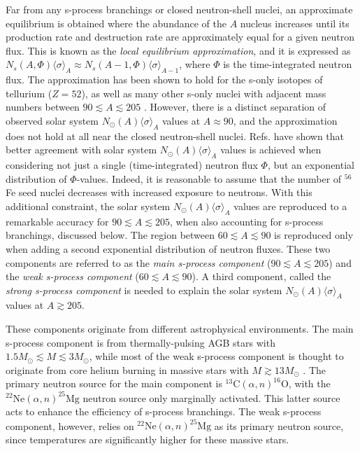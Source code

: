 Far from any s-process branchings or closed neutron-shell nuclei, an approximate equilibrium is obtained where the abundance of the $A$ nucleus increases until its production rate and destruction rate are approximately equal for a given neutron flux. This is known as the \emph{local equilibrium approximation}, and it is expressed as $N_{s}(A,\Phi)\langle \sigma \rangle_{A} \approx N_{s}(A-1,\Phi)\langle \sigma \rangle_{A-1}$, where $\Phi$ is the time-integrated neutron flux. The approximation has been shown to hold for the s-only isotopes of tellurium ($Z=52$), as well as many other s-only nuclei with adjacent mass numbers between $90 \lesssim A \lesssim 205$ \cite{Iliadis2015}. However, there is a distinct separation of observed solar system $N_{\odot}(A)\langle \sigma \rangle_{A}$ values at $A \approx 90$, and the approximation does not hold at all near the closed neutron-shell nuclei. Refs. \cite{Clayton1961,Seeger1965} have shown that better agreement with solar system $N_{\odot}(A)\langle \sigma \rangle_{A}$ values is achieved when considering not just a single (time-integrated) neutron flux $\Phi$, but an exponential distribution of $\Phi$-values. Indeed, it is reasonable to assume that the number of $^{56}$Fe seed nuclei decreases with increased exposure to neutrons. With this additional constraint, the solar system $N_{\odot}(A)\langle \sigma \rangle_{A}$ values are reproduced to a remarkable accuracy for $90 \lesssim A \lesssim 205$, when also accounting for s-process branchings, discussed below. The region between $60 \lesssim A \lesssim 90$ is reproduced only when adding a second exponential distribution of neutron fluxes. These two components are referred to as the \emph{main s-process component} ($90 \lesssim A \lesssim 205$) and the \emph{weak s-process component} ($60 \lesssim A \lesssim 90$). A third component, called the \emph{strong s-process component} is needed to explain the solar system $N_{\odot}(A)\langle \sigma \rangle_{A}$ values at $A \gtrsim 205$. 



These components originate from different astrophysical environments. The main s-process component is from thermally-pulsing AGB stars with $1.5 M_{\odot} \lesssim M \lesssim 3 M_{\odot}$, while most of the weak s-process component is thought to originate from core helium burning in massive stars with $M \gtrsim 13 M_{\odot}$ \cite{Iliadis2015}. The primary neutron source for the main component is $^{13}\mathrm{C}(\alpha,n)^{16}\mathrm{O}$, with the $^{22}\mathrm{Ne}(\alpha,n)^{25}\mathrm{Mg}$ neutron source only marginally activated. This latter source acts to enhance the efficiency of s-process branchings. The weak s-process component, however, relies on $^{22}\mathrm{Ne}(\alpha,n)^{25}\mathrm{Mg}$ as its primary neutron source, since temperatures are significantly higher for these massive stars.

